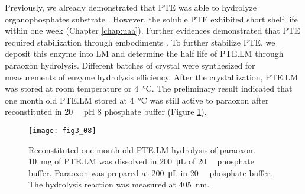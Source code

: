 \begin{refsection}
Previously, we already demonstrated that PTE
was able to hydrolyze organophosphates substrate \cite{Yang2014a,Baker2011b}.
However, the soluble PTE exhibited short shelf life within one week (Chapter
\ref{chap:uaa}). Further evidences demonstrated that PTE required stabilization
through embodiments \cite{Chen1998,Gill2000,Havens1993,Masson2009a}. To further
stabilize PTE, we deposit this enzyme into LM and determine the half life of
PTE.LM through paraoxon hydrolysis. Different batches of crystal were
synthesized for measurements of enzyme hydrolysis efficiency. After the
crystallization, PTE.LM was stored at room temperature or \SI{4}{\celsius}. The
preliminary result indicated that one month old PTE.LM stored at
\SI{4}{\celsius} was still active to paraoxon after reconstituted in
\SI{20}{\milli\Molar} pH 8 phosphate buffer (Figure \ref{fig:ptelm-one-month}). 
\begin{figure}[htbp] \centering \texttt{[image: fig3\_08]}
    \caption[Reconstituted one month old PTE.LM hydrolysis of paraoxon.
        \SI{10}{\mg} of PTE.LM was dissolved in \SI{200}{\micro\liter} of
        \SI{20}{\milli\Molar} phosphate buffer. Paraoxon was prepared at
        \SI{200}{\micro\liter} in \SI{20}{\milli\Molar} phosphate buffer. The
    hydrolysis reaction was measured at \SI{405}{\nm}.] {Reconstituted one month
        old PTE.LM hydrolysis of paraoxon.  \SI{10}{\mg} of PTE.LM was
        dissolved in \SI{200}{\micro\liter} of \SI{20}{\milli\Molar} phosphate
        buffer.  Paraoxon was prepared at \SI{200}{\micro\liter} in
        \SI{20}{\milli\Molar} phosphate buffer. The hydrolysis reaction was
        measured at \SI{405}{\nm}.} 
        \label{fig:ptelm-one-month} 
\end{figure}


\end{refsection}
